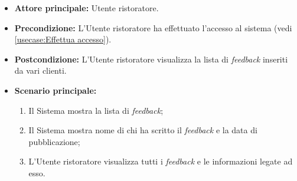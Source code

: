 \label{usecase:Consultazione lista feedback}
\begin{itemize}
	\item \textbf{Attore principale:} Utente ristoratore.

	\item \textbf{Precondizione:} L'Utente ristoratore ha effettuato l'accesso al sistema (vedi \autoref{usecase:Effettua accesso}).

	\item \textbf{Postcondizione:} L'Utente ristoratore visualizza la lista di \textit{feedback} inseriti da vari clienti.


	\item \textbf{Scenario principale:}
	      \begin{enumerate}
		      \item Il Sistema mostra la lista di \textit{feedback};
		      \item Il Sistema mostra nome di chi ha scritto il \textit{feedback} e la data di pubblicazione;
		      \item L'Utente ristoratore visualizza tutti i \textit{feedback} e le informazioni legate ad esso.

	      \end{enumerate}
\end{itemize}
